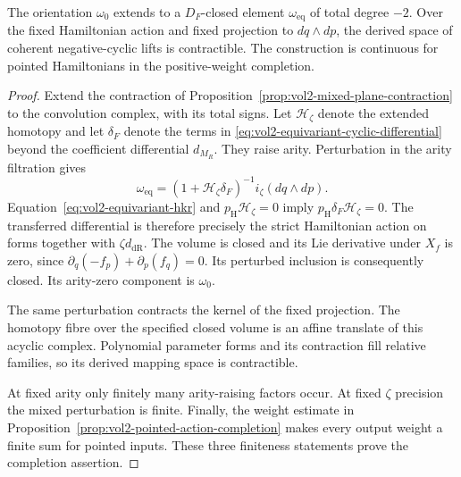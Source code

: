 \begin{theorem}\label{thm:vol2-coherent-cyclic-orientation}
The orientation $\omega_0$ extends to a $D_F$-closed element
$\omega_{\mathrm{eq}}$ of total degree $-2$.
Over the fixed Hamiltonian action and fixed projection to
$dq\wedge dp$, the derived space of coherent negative-cyclic
lifts is contractible. The construction is continuous for
pointed Hamiltonians in the positive-weight completion.
\end{theorem}
\begin{proof}
Extend the contraction of
Proposition~\ref{prop:vol2-mixed-plane-contraction} to the
convolution complex, with its total signs. Let
$\mathcal H_\zeta$ denote the extended homotopy and let
$\delta_F$ denote the terms in
\eqref{eq:vol2-equivariant-cyclic-differential} beyond the
coefficient differential $d_{M_R}$. They raise arity.
Perturbation in the arity filtration gives
\begin{equation}\label{eq:vol2-equivariant-volume-formula}
 \omega_{\mathrm{eq}}
    =(1+\mathcal H_\zeta\delta_F)^{-1}
          i_\zeta(dq\wedge dp).
\end{equation}
Equation~\eqref{eq:vol2-equivariant-hkr} and
$p_{\mathrm H}\mathcal H_\zeta=0$ imply
$p_{\mathrm H}\delta_F\mathcal H_\zeta=0$.
The transferred differential is therefore precisely the strict
Hamiltonian action on forms together with
$\zeta d_{\mathrm{dR}}$. The volume is closed and its Lie
derivative under $X_f$ is zero, since
$\partial_q(-f_p)+\partial_p(f_q)=0$.
Its perturbed inclusion is consequently closed. Its arity-zero
component is $\omega_0$.

The same perturbation contracts the kernel of the fixed
projection. The homotopy fibre over the specified closed volume
is an affine translate of this acyclic complex. Polynomial
parameter forms and its contraction fill relative families,
so its derived mapping space is contractible.

At fixed arity only finitely many arity-raising factors occur.
At fixed $\zeta$ precision the mixed perturbation is finite.
Finally, the weight estimate in
Proposition~\ref{prop:vol2-pointed-action-completion} makes
every output weight a finite sum for pointed inputs. These
three finiteness statements prove the completion assertion.
\end{proof}

